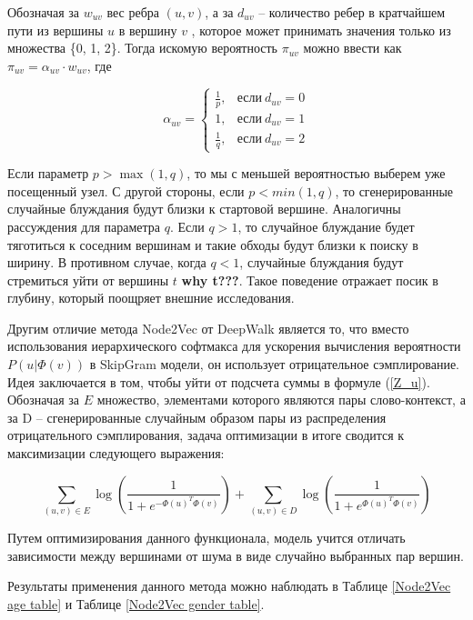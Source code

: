 Обозначая за $w_{uv}$ вес ребра $(u, v)$, а за $d_{uv}$ -- количество ребер в кратчайшем пути из вершины $u$ в вершину $v$ , которое может принимать значения только из множества \{0, 1, 2\}. Тогда искомую вероятность $\pi_{uv}$ можно ввести как $\pi_{uv} = \alpha_{uv} \cdot w_{uv}$, где 

$$
\alpha_{uv} = 
\begin{cases}
\frac{1}{p}, & \text{если} \  d_{uv} = 0 \\
1, & \text{если}  \ d_{uv} = 1 \\
\frac{1}{q}, & \text{если} \ d_{uv} = 2
\end{cases}
$$

Если параметр $p > \max(1, q)$, то мы с меньшей вероятностью выберем уже посещенный узел. С другой стороны, если $p < min(1, q)$, то сгенерированные случайные блуждания будут близки к стартовой вершине. Аналогичны рассуждения для параметра $q$. Если $q > 1$, то случайное блуждание будет тяготиться к соседним вершинам и такие обходы будут близки к поиску в ширину. В противном случае, когда $q < 1$, случайные блуждания будут стремиться уйти от вершины $t$ \textbf{why t???}. Такое поведение отражает посик в глубину, который поощряет внешние исследования.

Другим отличие метода Node2Vec от DeepWalk является то, что вместо использования иерархического софтмакса для ускорения вычисления вероятности $P(u | \Phi(v))$ в SkipGram модели, он использует отрицательное сэмплирование. Идея заключается в том, чтобы уйти от подсчета суммы в формуле (\ref{Z_u}). Обозначая за $E$ множество, элементами которого являются пары слово-контекст, а за D -- сгенерированные случайным образом пары из распределения отрицательного сэмплирования, задача оптимизации в итоге сводится к максимизации следующего выражения:

$$
\sum_{(u, v) \in E} \log (\frac{1}{1 + e^{-\Phi(u)^T \Phi(v)}}) + \sum_{(u, v) \in D} \log (\frac{1}{1 + e^{\Phi(u)^T \Phi(v)}}) 
$$

Путем оптимизирования данного функционала, модель учится отличать зависимости между вершинами от шума в виде случайно
выбранных пар вершин.

Результаты применения данного метода можно наблюдать в Таблице \ref{Node2Vec age table} и Таблице \ref{Node2Vec gender table}. 

